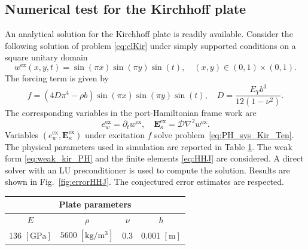 \documentclass{ifacconf}
\begin{document}
 
\subsection{Numerical test for the Kirchhoff plate}
An analytical solution for the Kirchhoff plate is readily available. Consider the following solution of problem \eqref{eq:clKir} under simply supported conditions on a square unitary domain
\[
w^{\text{ex}}(x,y,t) = \sin(\pi x) \sin(\pi y) \sin(t), \quad  (x, y) \in (0,1)\times (0,1).
\] 
The forcing term is given by  
\[
f = (4 D \pi^4 - \rho b) \sin(\pi x) \sin(\pi y) \sin(t), \quad D = \frac{E_Y b^3}{12 (1-\nu^2)}.
\]
The corresponding variables in the port-Hamiltonian frame work are
\[
e_w^{\text{ex}} = \partial_t w^{\text{ex}}, \quad \bm{E}_\kappa^{\text{ex}} = \mathcal{D} \nabla^2 w^{\text{ex}}.
\]
Variables $(e_w^{\text{ex}}, \bm{E}_\kappa^{\text{ex}})$ under excitation $f$ solve problem~\eqref{eq:PH_sys_Kir_Ten}. The physical parameters used in simulation are reported in Table \ref{tab:parKir}. The weak form \eqref{eq:weak_kir_PH} and the finite elements \eqref{eq:HHJ} are considered. A direct solver with an LU preconditioner is used to compute the solution. Results are shown in Fig.~\ref{fig:errorHHJ}. The conjectured error estimates are respected.

\begin{table}[h]
	\centering
	\begin{tabular}{cccc}
		\hline 
		\multicolumn{4}{c}{Plate parameters} \\ 
		\hline 
		$E$ & $\rho$ & $\nu$  & $h$ \\
		136 $[\textrm{GPa}]$ & $5600\; [\textrm{kg}/\textrm{m}^3]$ & 0.3 &  0.001 $[\textrm{m}]$\\ 
		\hline 
	\end{tabular} 
	\captionsetup{width=0.95\linewidth}
	\vspace{1mm}
	\label{tab:parKir}
\end{table}
\end{document}
